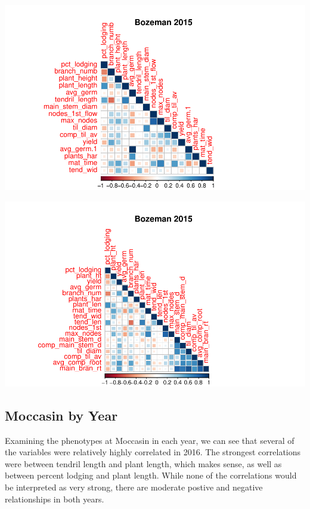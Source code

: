 \documentclass[11pt]{article}\usepackage[]{graphicx}\usepackage[]{color}
\makeatletter
\def\maxwidth{ %
  \ifdim\Gin@nat@width>\linewidth
    \linewidth
  \else
    \Gin@nat@width
  \fi
}
\newenvironment{knitrout}{}{} %
\makeatother
\begin{document}
\begin{knitrout}\footnotesize
{}\color{fgcolor}

{\centering \includegraphics[width=\maxwidth]{figure/nextchunk-1} 

}




{\centering \includegraphics[width=\maxwidth]{figure/nextchunk-2} 

}



\end{knitrout}

\subsection{Moccasin by Year}
Examining the phenotypes at Moccasin in each year, we can see that several of the variables were relatively highly correlated in 2016. The strongest correlations were between tendril length and plant length, which makes sense, as well as between percent lodging and plant length. While none of the correlations would be interpreted as very strong, there are moderate postive and negative relationships in both years. 
\end{document}
